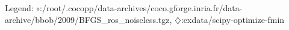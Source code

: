 Legend: {\color{NavyBlue}$\circ$}:/root/.cocopp/data-archives/coco.gforge.inria.fr/data-archive/bbob/2009/BFGS\_ros\_noiseless.tgz, {\color{Magenta}$\diamondsuit$}:exdata/scipy-optimize-fmin